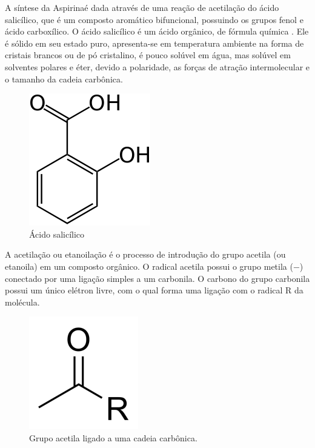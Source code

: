 A síntese da Aspirina\R é dada através de uma reação de acetilação do ácido salicílico, que é um
composto aromático bifuncional, possuindo os grupos fenol e ácido carboxílico. O ácido salicílico é
um ácido orgânico, de fórmula química . Ele é sólido em seu estado puro, apresenta-se em
temperatura ambiente na forma de cristais brancos ou de pó cristalino, é pouco solúvel em água, mas
solúvel em solventes polares e éter, devido a polaridade, as forças de atração intermolecular e o
tamanho da cadeia carbônica.

\begin{figure}[H]
\begin{center}
    \includegraphics[width=.3\textwidth]{figuras/acido_salicilico.png}
\end{center}
\caption{Ácido salicílico}\label{fig:acid_salicilico}
\end{figure}

A acetilação ou etanoilação é o processo de introdução do grupo acetila (ou etanoila) em um composto
orgânico. O radical acetila possui o grupo metila ($-$) conectado por uma ligação simples a um
carbonila. O carbono do grupo carbonila possui um único elétron livre, com o qual forma uma ligação
com o radical R da molécula.

\begin{figure}[H]
\begin{center}
    \includegraphics[width=.3\textwidth]{figuras/im1.png}
\end{center}
\caption{Grupo acetila ligado a uma cadeia carbônica.}\label{fig:im1}
\end{figure}

